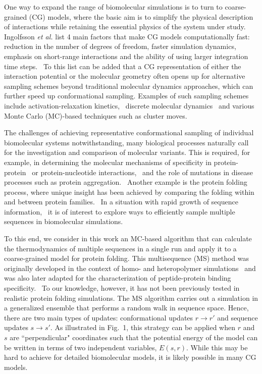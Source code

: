 \documentclass[
aip,
rsi,%
amsmath,amssymb,
reprint,%
]{revtex4-1}
\newcommand	 {\sbar}	{{s}}
\newcommand	 {\rbar}	{{r}}
\begin{document}
One way to expand the range of biomolecular simulations is to turn to coarse-grained (CG) models, where the basic aim is to simplify the physical description of interactions while retaining the essential physics of the system under study.~\cite{Riniker2012} Ingolfsson \textit{et al.} list 4 main factors that make CG models computationally fast: reduction in the number of degrees of freedom, faster simulation dynamics, emphasis on short-range interactions and the ability of using larger integration time steps.~\cite{Ingolfsson2014} To this list can be added that a CG representation of either the interaction potential or the molecular geometry often opens up for alternative sampling schemes beyond traditional molecular dynamics approaches, which can further speed up conformational sampling. Examples of such sampling schemes include activation-relaxation kinetics,~\cite{Beland2011} discrete molecular dynamics~\cite{Proctor2011} and various Monte Carlo (MC)-based techniques such as cluster moves.~\cite{Vitalis2009} 

The challenges of achieving representative conformational sampling of individual biomolecular systems notwithstanding, many biological processes naturally call for the investigation and comparison of molecular variants. This is required, for example, in determining the molecular mechanisms of specificity in protein-protein~\cite{Zarrinpar2003,Hakes2007} or protein-nucleotide interactions,~\cite{Rohs2010} and the role of mutations in disease processes such as protein aggregation.~\cite{Ross2004} Another example is the protein folding process, where unique insight has been achieved by comparing the folding within and between protein families.~\cite{Tzul2017,Wensley2010} In a situation with rapid growth of sequence information,~\cite{Vukmirovic2000} it is of interest to explore ways to efficiently sample multiple sequences in biomolecular simulations. 

To this end, we consider in this work an MC-based algorithm that can calculate the thermodynamics of multiple sequences in a single run and apply it to a coarse-grained model for protein folding. This multisequence (MS) method was originally developed in the context of homo- and heteropolymer simulations~\cite{Irback1995} and was also later adapted for the characterization of peptide-protein binding specificity.~\cite{Bhattacherjee2013,Wallin2017} To our knowledge, however, it has not been previously tested in realistic protein folding simulations. The MS algorithm carries out a simulation in a generalized ensemble that performs a random walk in sequence space. Hence, there are two main types of updates: conformational updates $\rbar\rightarrow\rbar'$ and sequence updates $\sbar\rightarrow\sbar'$. As illustrated in Fig.~1, this strategy can be applied when $\rbar$ and $\sbar$ are ``perpendicular" coordinates such that the potential energy of the model can be written in terms of two independent variables, $E(\sbar,\rbar)$. While this may be hard to achieve for detailed biomolecular models, it is likely possible in many CG models.
\end{document}
